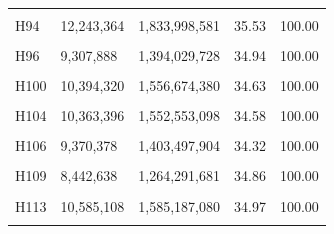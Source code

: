 \documentclass[
  a4paper,
  titlepage]{article}
\begin{document}
\begin{longtable}[t]{lllll}
\cellcolor{gray!6}{H93} & \cellcolor{gray!6}{7,630,890} & \cellcolor{gray!6}{1,142,655,506} & \cellcolor{gray!6}{34.64} & \cellcolor{gray!6}{100.00}\\
 
H94 & 12,243,364 & 1,833,998,581 & 35.53 & 100.00\\
 
\cellcolor{gray!6}{H95} & \cellcolor{gray!6}{8,461,766} & \cellcolor{gray!6}{1,266,493,753} & \cellcolor{gray!6}{34.68} & \cellcolor{gray!6}{100.00}\\
 
H96 & 9,307,888 & 1,394,029,728 & 34.94 & 100.00\\
 
\cellcolor{gray!6}{H97} & \cellcolor{gray!6}{8,315,308} & \cellcolor{gray!6}{1,245,382,415} & \cellcolor{gray!6}{35.05} & \cellcolor{gray!6}{100.00}\\
 
H100 & 10,394,320 & 1,556,674,380 & 34.63 & 100.00\\
 
\cellcolor{gray!6}{H102} & \cellcolor{gray!6}{9,891,700} & \cellcolor{gray!6}{1,481,070,979} & \cellcolor{gray!6}{34.68} & \cellcolor{gray!6}{100.00}\\
 
H104 & 10,363,396 & 1,552,553,098 & 34.58 & 100.00\\
 
\cellcolor{gray!6}{H105} & \cellcolor{gray!6}{7,443,108} & \cellcolor{gray!6}{1,114,588,155} & \cellcolor{gray!6}{35.01} & \cellcolor{gray!6}{100.00}\\
 
H106 & 9,370,378 & 1,403,497,904 & 34.32 & 100.00\\
 
\cellcolor{gray!6}{H108} & \cellcolor{gray!6}{8,313,452} & \cellcolor{gray!6}{1,244,916,936} & \cellcolor{gray!6}{34.20} & \cellcolor{gray!6}{100.00}\\
 
H109 & 8,442,638 & 1,264,291,681 & 34.86 & 100.00\\
 
\cellcolor{gray!6}{H112} & \cellcolor{gray!6}{12,163,126} & \cellcolor{gray!6}{1,821,886,417} & \cellcolor{gray!6}{35.56} & \cellcolor{gray!6}{100.00}\\
 
H113 & 10,585,108 & 1,585,187,080 & 34.97 & 100.00\\
 
\cellcolor{gray!6}{H115} & \cellcolor{gray!6}{11,786,208} & \cellcolor{gray!6}{1,764,929,603} & \cellcolor{gray!6}{34.71} & \cellcolor{gray!6}{100.00}\\
 

\end{longtable}
\end{document}
